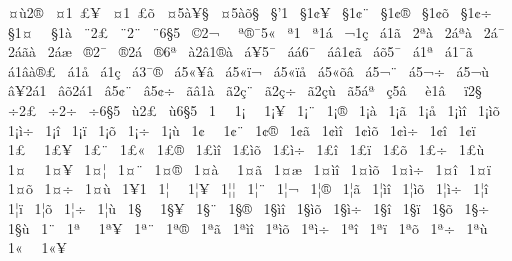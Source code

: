 {^^a0^^a4^^f92^^ae
^^a0^^a41^^a0^^a3^^a5
^^a0^^a41^^a0^^a3^^f5
^^a0^^a45^^e0^^a5^^a7
^^a0^^a45^^e0^^f5^^a7
^^a0^^a7'1
^^a0^^a71^^a2^^a5
^^a0^^a71^^a2^^a8
^^a0^^a71^^a2^^ae
^^a0^^a71^^a2^^f5
^^a0^^a71^^a2^^f7
^^a0^^a71^^a4^^a0
^^a0^^a71^^e0
^^a0^^a82^^a3
^^a0^^a82^^ad^^a8
^^a0^^a86^^a75
^^a0^^a92^^ac^^a0
^^a0^^aa^^ae^^af5^^ab
^^a0^^aa1^^ad
^^a0^^aa1^^e1
^^a0^^ac1^^e7
^^a0^^ad^^e11^^e3
^^a0^^ad2^^aa^^e0
^^a0^^ad2^^e1^^aa^^e0
^^a0^^ad2^^e1^^af
^^a0^^ad2^^e1^^e3^^e0
^^a0^^ad2^^e1^^e6
^^a0^^ae2^^af
^^a0^^ae2^^e1
^^a0^^ae6^^aa
^^a0^^e02^^e21^^ae^^e0
^^a0^^e1^^a55^^af
^^a0^^e1^^e16^^af
^^a0^^e1^^e21^^a2^^e3
^^a0^^e1^^f55^^af
^^a0^^e11^^aa
^^a0^^e11^^af^^e3
^^a0^^e11^^e2^^e0^^ae^^a3
^^a0^^e11^^e5
^^a0^^e11^^e7
^^a0^^e13^^af^^ae
^^a0^^e15^^ab^^a5^^e2
^^a0^^e15^^ab^^ef^^ac
^^a0^^e15^^ab^^ef^^e5
^^a0^^e15^^ab^^f5^^e2
^^a0^^e15^^ac^^a8
^^a0^^e15^^ac^^f7
^^a0^^e15^^ac^^f9
^^a0^^e2^^a52^^e11
^^a0^^e2^^f52^^e11
^^a0^^e25^^a2^^a8
^^a0^^e25^^a2^^f7
^^a0^^e3^^e21^^e0
^^a0^^e32^^e7^^a8
^^a0^^e32^^e7^^f7
^^a0^^e32^^e7^^f9
^^a0^^e35^^e1^^aa
^^a0^^e75^^e2^^a0
^^a0^^e81^^e2^^a0
^^a0^^ef2^^a7
^^a0^^f72^^a3
^^a0^^f72^^ad^^f7
^^a0^^f76^^a75
^^a0^^f92^^a3
^^a0^^f96^^a75
^^a01^^a0
^^a01^^a1^^a0
^^a01^^a1^^a5
^^a01^^a1^^a8
^^a01^^a1^^ae
^^a01^^a1^^e0
^^a01^^a1^^e3
^^a01^^a1^^e5
^^a01^^a1^^ec^^ee
^^a01^^a1^^ec^^f5
^^a01^^a1^^ec^^f7
^^a01^^a1^^ee
^^a01^^a1^^ef
^^a01^^a1^^f5
^^a01^^a1^^f7
^^a01^^a1^^f9
^^a01^^a2^^a0
^^a01^^a2^^a8
^^a01^^a2^^ae
^^a01^^a2^^e3
^^a01^^a2^^ec^^ee
^^a01^^a2^^ec^^f5
^^a01^^a2^^ec^^f7
^^a01^^a2^^ee
^^a01^^a2^^ef
^^a01^^a3^^a0
^^a01^^a3^^a5
^^a01^^a3^^a8
^^a01^^a3^^ab
^^a01^^a3^^ae
^^a01^^a3^^ec^^ee
^^a01^^a3^^ec^^f5
^^a01^^a3^^ec^^f7
^^a01^^a3^^ee
^^a01^^a3^^ef
^^a01^^a3^^f5
^^a01^^a3^^f7
^^a01^^a3^^f9
^^a01^^a4^^a0
^^a01^^a4^^a5
^^a01^^a4^^a6
^^a01^^a4^^a8
^^a01^^a4^^ae
^^a01^^a4^^e0^^a0
^^a01^^a4^^e3
^^a01^^a4^^e6
^^a01^^a4^^ec^^ee
^^a01^^a4^^ec^^f5
^^a01^^a4^^ec^^f7
^^a01^^a4^^ee
^^a01^^a4^^ef
^^a01^^a4^^f5
^^a01^^a4^^f7
^^a01^^a4^^f9
^^a01^^a51
^^a01^^a6^^a0
^^a01^^a6^^a5
^^a01^^a6^^a6
^^a01^^a6^^a8
^^a01^^a6^^ac
^^a01^^a6^^ae
^^a01^^a6^^e3
^^a01^^a6^^ec^^ee
^^a01^^a6^^ec^^f5
^^a01^^a6^^ec^^f7
^^a01^^a6^^ee
^^a01^^a6^^ef
^^a01^^a6^^f5
^^a01^^a6^^f7
^^a01^^a6^^f9
^^a01^^a7^^a0
^^a01^^a7^^a5
^^a01^^a7^^a8
^^a01^^a7^^ae
^^a01^^a7^^ec^^ee
^^a01^^a7^^ec^^f5
^^a01^^a7^^ec^^f7
^^a01^^a7^^ee
^^a01^^a7^^ef
^^a01^^a7^^f5
^^a01^^a7^^f7
^^a01^^a7^^f9
^^a01^^a8
^^a01^^aa^^a0
^^a01^^aa^^a5
^^a01^^aa^^a8
^^a01^^aa^^ae
^^a01^^aa^^e3
^^a01^^aa^^ec^^ee
^^a01^^aa^^ec^^f5
^^a01^^aa^^ec^^f7
^^a01^^aa^^ee
^^a01^^aa^^ef
^^a01^^aa^^f5
^^a01^^aa^^f7
^^a01^^aa^^f9
^^a01^^ab^^a0
^^a01^^ab^^a5
}

